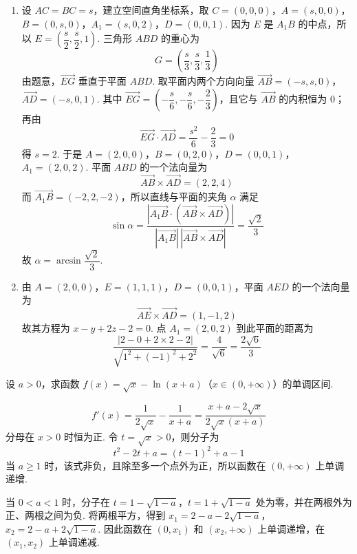 \begin{solution}
\begin{enumerate}
\item 设 \(AC=BC=s\)，建立空间直角坐标系，取
\(C=(0,0,0)\)，\(A=(s,0,0)\)，\(B=(0,s,0)\)，\(A_1=(s,0,2)\)，\(D=(0,0,1)\).
因为 \(E\) 是 \(A_1B\) 的中点，所以 \(E=\left(\dfrac s2,\dfrac s2,1\right)\). 三角形 \(ABD\) 的重心为
\[
G=\left(\frac s3,\frac s3,\frac13\right)
\]
由题意，\(\overrightarrow{EG}\) 垂直于平面 \(ABD\). 取平面内两个方向向量
\(\overrightarrow{AB}=(-s,s,0)\)，\(\overrightarrow{AD}=(-s,0,1)\).
其中 \(\overrightarrow{EG}=\left(-\dfrac s6,-\dfrac s6,-\dfrac23\right)\)，且它与 \(\overrightarrow{AB}\) 的内积恒为 0；再由
\[
\overrightarrow{EG}\cdot\overrightarrow{AD}=\frac{s^2}{6}-\frac23=0
\]
得 \(s=2\). 于是
\(A=(2,0,0)\)，\(B=(0,2,0)\)，\(D=(0,0,1)\)，\(A_1=(2,0,2)\).
平面 \(ABD\) 的一个法向量为
\[
\overrightarrow{AB}\times\overrightarrow{AD}=(2,2,4)
\]
而 \(\overrightarrow{A_1B}=(-2,2,-2)\)，所以直线与平面的夹角 \(\alpha\) 满足
\[
\sin\alpha=\frac{|\overrightarrow{A_1B}\cdot(\overrightarrow{AB}\times\overrightarrow{AD})|}{|\overrightarrow{A_1B}|\,|\overrightarrow{AB}\times\overrightarrow{AD}|}=\frac{\sqrt2}{3}
\]
故 \(\alpha=\arcsin\dfrac{\sqrt2}{3}\).

\item 由 \(A=(2,0,0)\)，\(E=(1,1,1)\)，\(D=(0,0,1)\)，平面 \(AED\) 的一个法向量为
\[
\overrightarrow{AE}\times\overrightarrow{AD}=(1,-1,2)
\]
故其方程为 \(x-y+2z-2=0\). 点 \(A_1=(2,0,2)\) 到此平面的距离为
\[
\frac{|2-0+2\times2-2|}{\sqrt{1^2+(-1)^2+2^2}}=\frac4{\sqrt6}=\frac{2\sqrt6}{3}
\]
\end{enumerate}
\end{solution}

\begin{problem}
设 \(a > 0\)，求函数 \(f(x) = \sqrt{x} - \ln (x + a)\)（\(x \in (0, +\infty)\)）的单调区间.
\end{problem}

\begin{solution}
\[
f'(x)=\frac1{2\sqrt{x}}-\frac1{x+a}=\frac{x+a-2\sqrt{x}}{2\sqrt{x}(x+a)}
\]
分母在 \(x>0\) 时恒为正. 令 \(t=\sqrt{x}>0\)，则分子为
\[
t^2-2t+a=(t-1)^2+a-1
\]
当 \(a\geqslant1\) 时，该式非负，且除至多一个点外为正，所以函数在 \((0,+\infty)\) 上单调递增.

当 \(0<a<1\) 时，分子在
\(t=1-\sqrt{1-a}\)，\(t=1+\sqrt{1-a}\)
处为零，并在两根外为正、两根之间为负. 将两根平方，得到
\(x_1=2-a-2\sqrt{1-a}\)，\(x_2=2-a+2\sqrt{1-a}\).
因此函数在 \((0,x_1)\) 和 \((x_2,+\infty)\) 上单调递增，在 \((x_1,x_2)\) 上单调递减.
\end{solution}

